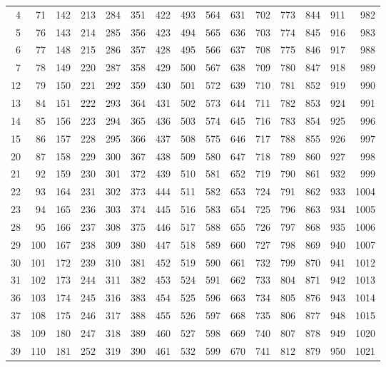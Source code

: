 \documentclass{assignment}
\begin{document}
\begin{tabular}{r r r r r r r r r r r r r r r}
4 & 71 & 142 & 213 & 284 & 351 & 422 & 493 & 564 & 631 & 702 & 773 & 844 & 911 & 982 \\
5 & 76 & 143 & 214 & 285 & 356 & 423 & 494 & 565 & 636 & 703 & 774 & 845 & 916 & 983 \\
6 & 77 & 148 & 215 & 286 & 357 & 428 & 495 & 566 & 637 & 708 & 775 & 846 & 917 & 988 \\
7 & 78 & 149 & 220 & 287 & 358 & 429 & 500 & 567 & 638 & 709 & 780 & 847 & 918 & 989 \\
12 & 79 & 150 & 221 & 292 & 359 & 430 & 501 & 572 & 639 & 710 & 781 & 852 & 919 & 990 \\
13 & 84 & 151 & 222 & 293 & 364 & 431 & 502 & 573 & 644 & 711 & 782 & 853 & 924 & 991 \\
14 & 85 & 156 & 223 & 294 & 365 & 436 & 503 & 574 & 645 & 716 & 783 & 854 & 925 & 996 \\
15 & 86 & 157 & 228 & 295 & 366 & 437 & 508 & 575 & 646 & 717 & 788 & 855 & 926 & 997 \\
20 & 87 & 158 & 229 & 300 & 367 & 438 & 509 & 580 & 647 & 718 & 789 & 860 & 927 & 998 \\
21 & 92 & 159 & 230 & 301 & 372 & 439 & 510 & 581 & 652 & 719 & 790 & 861 & 932 & 999 \\
22 & 93 & 164 & 231 & 302 & 373 & 444 & 511 & 582 & 653 & 724 & 791 & 862 & 933 & 1004 \\
23 & 94 & 165 & 236 & 303 & 374 & 445 & 516 & 583 & 654 & 725 & 796 & 863 & 934 & 1005 \\
28 & 95 & 166 & 237 & 308 & 375 & 446 & 517 & 588 & 655 & 726 & 797 & 868 & 935 & 1006 \\
29 & 100 & 167 & 238 & 309 & 380 & 447 & 518 & 589 & 660 & 727 & 798 & 869 & 940 & 1007 \\
30 & 101 & 172 & 239 & 310 & 381 & 452 & 519 & 590 & 661 & 732 & 799 & 870 & 941 & 1012 \\
31 & 102 & 173 & 244 & 311 & 382 & 453 & 524 & 591 & 662 & 733 & 804 & 871 & 942 & 1013 \\
36 & 103 & 174 & 245 & 316 & 383 & 454 & 525 & 596 & 663 & 734 & 805 & 876 & 943 & 1014 \\
37 & 108 & 175 & 246 & 317 & 388 & 455 & 526 & 597 & 668 & 735 & 806 & 877 & 948 & 1015 \\
38 & 109 & 180 & 247 & 318 & 389 & 460 & 527 & 598 & 669 & 740 & 807 & 878 & 949 & 1020 \\
39 & 110 & 181 & 252 & 319 & 390 & 461 & 532 & 599 & 670 & 741 & 812 & 879 & 950 & 1021 \\

\end{tabular}
\end{document}
